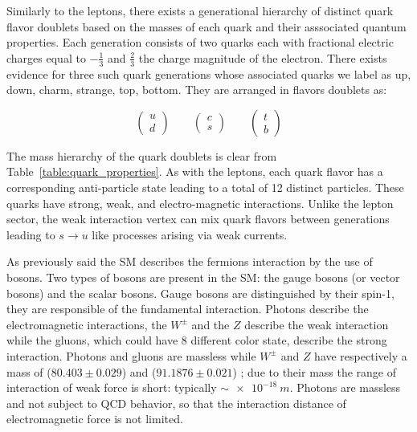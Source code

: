 Similarly to the leptons, there exists a generational hierarchy of distinct quark flavor doublets  based on the masses of each quark and their asssociated quantum properties. Each generation consists of two quarks each with fractional electric charges equal to $-\frac{1}{3}$ and $\frac{2}{3}$ the charge magnitude of the electron. There exists evidence for three such quark generations whose associated quarks we label as up, down, charm, strange, top, bottom.  They are arranged in flavors doublets as:            

\begin{equation}
\begin{pmatrix} u \\ d \end{pmatrix} \qquad
\begin{pmatrix} c \\ s \end{pmatrix} \qquad
\begin{pmatrix} t \\ b \end{pmatrix}
\label{eqn:quark_flavor_doublets}
\end{equation}

The mass hierarchy of the quark doublets is clear from Table~\ref{table:quark_properties}. As with the leptons, each quark flavor has a corresponding anti-particle state leading to a total of 12 distinct particles. These quarks have strong, weak, and electro-magnetic interactions. Unlike the lepton sector, the weak interaction vertex can mix quark  flavors between generations leading to $s \rightarrow u$ like processes arising via weak currents. 

As previously said the SM describes the fermions interaction by the use of bosons. Two types of bosons are present in the SM: the gauge bosons (or vector bosons) and the scalar bosons.
Gauge bosons are distinguished by their spin-1, they are responsible of the fundamental interaction. Photons describe the electromagnetic interactions, the $W^\pm$ and the $Z$ describe the weak interaction while the gluons, which could have 8 different color state, describe the strong interaction.
Photons and gluons are massless while $W^\pm$ and $Z$ have respectively a mass of ($80.403 \pm 0.029$) \GeV \cite{PDG} and ($91.1876\pm0.021$) \GeV \cite{PDG}; due to their mass the range of interaction of weak force is short: typically $\sim\SI{e-18}{m}$. %
Photons are massless and not subject to QCD behavior, so that the interaction distance of electromagnetic force is not limited.

